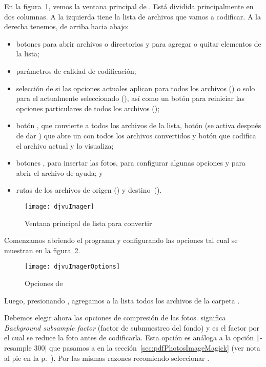 \documentclass[%
	a5paper,
	10pt,
	twoside,
	openright,
	final,
]{memoir}
\begin{document}
{	En la figura~\ref{fig:djvuImager}, vemos la ventana principal de \djvuimager. Está dividida principalmente en dos columnas. A la izquierda tiene la lista de archivos que vamos a codificar. A la derecha tenemos, de arriba hacia abajo:
	\begin{itemize}[noitemsep]
		\item botones para abrir archivos o directorios y para agregar o quitar elementos de la lista;
		\item parámetros de calidad de codificación;
		\item selección de si las opciones actuales aplican para todos los archivos () o solo para el actualmente seleccionado (), así como un botón para reiniciar las opciones particulares de todos los archivos ();
		\item botón , que convierte a \djvu todos los archivos de la lista, botón  (se activa después de dar ) que abre un \djvu con todos los archivos convertidos y botón  que codifica el archivo actual y lo visualiza;
		\item botones , para insertar las fotos,  para configurar algunas opciones y  para abrir el archivo de ayuda; y
		\item rutas de los archivos de origen () y destino~().
	\end{itemize} 

	\begin{figure}
		\texttt{[image: djvuImager]}
		\caption{Ventana principal de \djvuimager lista para convertir\label{fig:djvuImager}}
	\end{figure}

	Comenzamos abriendo el programa y configurando las opciones tal cual se muestran en la figura~\ref{fig:djvuImagerOptions}.

	\begin{figure}
		\texttt{[image: djvuImagerOptions]}
		\caption{Opciones de \djvuimager\label{fig:djvuImagerOptions}}
	\end{figure}

	Luego, presionando , agregamos a la lista todos los archivos de la carpeta .

	Debemos elegir ahora las opciones de compresión de las fotos.  significa \emph{Background subsample factor} (factor de submuestreo del fondo) y es el factor por el cual se reduce la foto antes de codificarla. Esta opción es análoga a la opción \texttt|-resample 300| que pasamos a \imagemagick en la sección~\ref{sec:pdfPhotosImageMagick} (ver nota al pie en la p.~\pageref{foot:resample}). Por las mismas razones recomiendo seleccionar .

}
\end{document}

